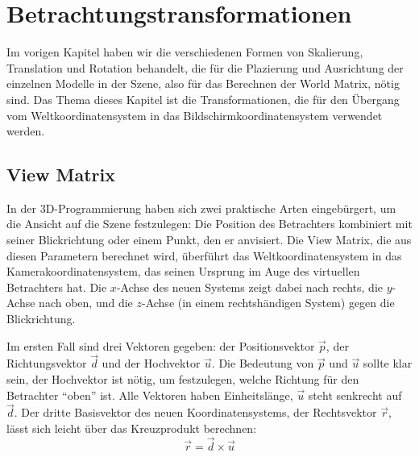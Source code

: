 \chapter{Betrachtungstransformationen}
\label{viewingtransformations}
Im vorigen Kapitel haben wir die verschiedenen Formen von Skalierung, Translation und Rotation behandelt, die für die Plazierung und Ausrichtung der einzelnen Modelle in der Szene, also für das Berechnen der World Matrix, nötig sind. Das Thema dieses Kapitel ist die Transformationen, die für den Übergang vom Weltkoordinatensystem in das Bildschirmkoordinatensystem verwendet werden.

\section{View Matrix}
\label{view}
In der 3D-Programmierung haben sich zwei praktische Arten eingebürgert, um die Ansicht auf die Szene festzulegen: Die Position des Betrachters kombiniert mit seiner Blickrichtung oder einem Punkt, den er anvisiert. Die View Matrix, die aus diesen Parametern berechnet wird, überführt das Weltkoordinatensystem in das Kamerakoordinatensystem, das seinen Ursprung im Auge des virtuellen Betrachters hat. Die $x$-Achse des neuen Systems zeigt dabei nach rechts, die $y$-Achse nach oben, und die $z$-Achse (in einem rechtshändigen System) gegen die Blickrichtung.

Im ersten Fall sind drei Vektoren gegeben: der Positionsvektor $\vec p$, der Richtungsvektor $\vec d$ und der Hochvektor $\vec u$. Die Bedeutung von $\vec p$ und $\vec u$ sollte klar sein, der Hochvektor ist nötig, um festzulegen, welche Richtung für den Betrachter \enquote{oben} ist. Alle Vektoren haben Einheitslänge, $\vec u$ steht senkrecht auf $\vec d$. Der dritte Basisvektor des neuen Koordinatensystems, der Rechtsvektor $\vec r$, lässt sich leicht über das Kreuzprodukt berechnen:
\begin{equation}
 \vec r = \vec d \times \vec u
\end{equation}

